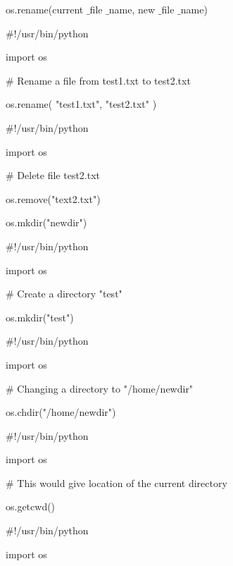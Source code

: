 \noindent 
os.rename(current $  \_  $file $  \_  $name, new $  \_  $file $  \_  $name) \par
\vspace{12pt}
\noindent 
 $  \#  $!/usr/bin/python \par
\noindent 
import os \par
\vspace{12pt}
\noindent 
 $  \#  $ Rename a file from test1.txt to test2.txt \par
\noindent 
os.rename( "test1.txt", "test2.txt" ) \par
\vspace{12pt}
\noindent 
 $  \#  $!/usr/bin/python \par
\noindent 
import os \par
\vspace{12pt}
\noindent 
 $  \#  $ Delete file test2.txt \par
\noindent 
os.remove("text2.txt") \par
\vspace{12pt}
\noindent 
os.mkdir("newdir") \par
\vspace{12pt}
\noindent 
 $  \#  $!/usr/bin/python \par
\noindent 
import os \par
\vspace{12pt}
\noindent 
 $  \#  $ Create a directory "test" \par
\noindent 
os.mkdir("test") \par
\vspace{12pt}
\noindent 
 $  \#  $!/usr/bin/python \par
\noindent 
import os \par
\vspace{12pt}
\noindent 
 $  \#  $ Changing a directory to "/home/newdir" \par
\noindent 
os.chdir("/home/newdir") \par
\vspace{12pt}
\noindent 
 $  \#  $!/usr/bin/python \par
\noindent 
import os \par
\vspace{12pt}
\noindent 
 $  \#  $ This would give location of the current directory \par
\noindent 
os.getcwd() \par
\vspace{12pt}
\noindent 
 $  \#  $!/usr/bin/python \par
\noindent 
import os \par

